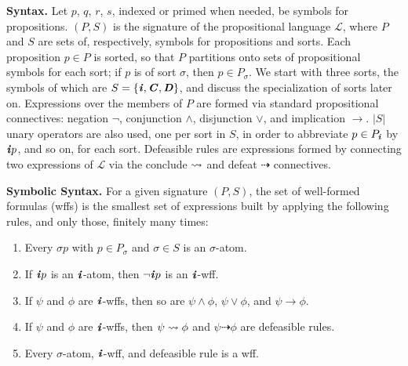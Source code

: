 \documentclass[10pt, conference, compsocconf]{IEEEtran}
\begin{document}
\textbf{Syntax.} Let $p$, $q$, $r$, $s$, indexed or primed when needed, be symbols for propositions. $(P, S)$ is the signature of the propositional language $\mathcal{L}$, where $P$ and $S$ are sets of, respectively, symbols for propositions and sorts. Each proposition $p \in P$ is sorted, so that $P$ partitions onto sets of propositional symbols for each sort; if $p$ is of sort $\sigma$, then $p \in P_{\sigma}$. We start with three sorts, the symbols of which are $S = \{ \textbf{\textit{i}}, \textbf{\textit{C}}, \textbf{\textit{D}} \}$, and discuss the specialization of sorts later on. Expressions over the members of $P$ are formed via standard propositional connectives: negation $\neg$, conjunction $\wedge$, disjunction $\vee$, and implication $\rightarrow$. $|S|$ unary operators are also used, one per sort in $S$, in order to abbreviate $p \in P_{\textbf{\textit{i}}}$ by $\textbf{\textit{i}}p$, and so on, for each sort. Defeasible rules are expressions formed by connecting two expressions of $\mathcal{L}$ via the conclude $\rightsquigarrow$ and defeat $\dashrightarrow$ connectives. 

\begin{definition}\label{def:symbolic-syntax}
	\textbf{Symbolic Syntax.} For a given signature $(P, S)$, the set of well-formed formulas (wffs) is the smallest set of expressions built by applying the following rules, and only those, finitely many times:
	\begin{enumerate}
		\item{Every $\sigma p$ with $p \in P_{\sigma}$ and $\sigma \in S$ is an $\sigma$-atom.}
		\item{If $\textbf{\textit{i}}p$ is an $\textbf{\textit{i}}$-atom, then $\neg\textbf{\textit{i}}p$ is an $\textbf{\textit{i}}$-wff.}
		\item{If $\psi$ and $\phi$ are $\textbf{\textit{i}}$-wffs, then so are $\psi \wedge \phi$, $\psi \vee \phi$, and $\psi \rightarrow \phi$.}
		\item{If $\psi$ and $\phi$ are $\textbf{\textit{i}}$-wffs, then $\psi \rightsquigarrow \phi$ and $\psi \dashrightarrow \phi$ are defeasible rules.}
		\item{Every $\sigma$-atom, $\textbf{\textit{i}}$-wff, and defeasible rule is a wff.}
	\end{enumerate}
\end{definition}
\end{document}
